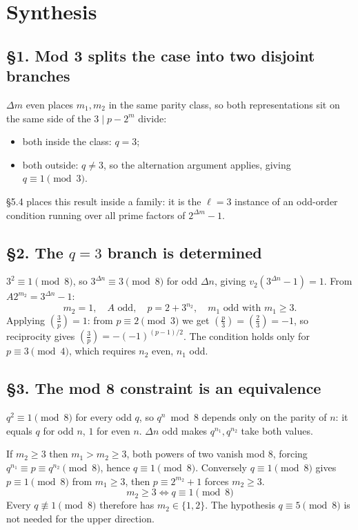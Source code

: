\documentclass[11pt]{article}
\begin{document}
\section*{Synthesis}

\subsection*{\S1. Mod 3 splits the case into two disjoint branches}

$\Delta m$ even places $m_1, m_2$ in the same parity class, so both representations sit on the same side of the $3 \mid p - 2^m$ divide:
\begin{itemize}
\item both inside the class: $q = 3$;
\item both outside: $q \neq 3$, so the alternation argument applies, giving $q \equiv 1 \pmod 3$.
\end{itemize}

\S5.4 places this result inside a family: it is the $\ell = 3$ instance of an odd-order condition running over all prime factors of $2^{\Delta m}-1$.

\subsection*{\S2. The $q = 3$ branch is determined}

$3^2 \equiv 1 \pmod 8$, so $3^{\Delta n} \equiv 3 \pmod 8$ for odd $\Delta n$, giving $v_2(3^{\Delta n} - 1) = 1$. From $A2^{m_2} = 3^{\Delta n} - 1$:
\[
m_2 = 1, \quad A \text{ odd}, \quad p = 2 + 3^{n_2}, \quad m_1 \text{ odd with } m_1 \geq 3.
\]
Applying $\left(\frac{3}{p}\right) = 1$: from $p \equiv 2 \pmod 3$ we get $\left(\frac{p}{3}\right) = \left(\frac{2}{3}\right) = -1$, so reciprocity gives $\left(\frac{3}{p}\right) = -(-1)^{(p-1)/2}$. The condition holds only for $p \equiv 3 \pmod 4$, which requires $n_2$ even, $n_1$ odd.

\subsection*{\S3. The mod 8 constraint is an equivalence}

$q^2 \equiv 1 \pmod 8$ for every odd $q$, so $q^n \bmod 8$ depends only on the parity of $n$: it equals $q$ for odd $n$, $1$ for even $n$. $\Delta n$ odd makes $q^{n_1}, q^{n_2}$ take both values.

If $m_2 \geq 3$ then $m_1 > m_2 \geq 3$, both powers of two vanish mod $8$, forcing $q^{n_1} \equiv p \equiv q^{n_2} \pmod 8$, hence $q \equiv 1 \pmod 8$. Conversely $q \equiv 1 \pmod 8$ gives $p \equiv 1 \pmod 8$ from $m_1 \geq 3$, then $p \equiv 2^{m_2} + 1$ forces $m_2 \geq 3$.
\[
\boxed{\,m_2 \geq 3 \iff q \equiv 1 \pmod 8\,}
\]
Every $q \not\equiv 1 \pmod 8$ therefore has $m_2 \in \{1,2\}$. The hypothesis $q \equiv 5 \pmod 8$ is not needed for the upper direction.
\end{document}
